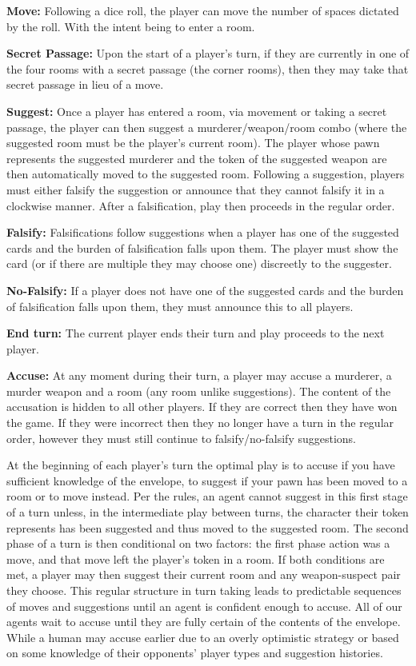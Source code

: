 \documentclass[msc, ai, twoside, notimes, logo, parskip, leftchapter, normalheadings]{infthesis}
\begin{document}
\begin{description}
\item \textbf{Move:} Following a dice roll, the player can move the number of spaces dictated by the roll. With the intent being to enter a room.
\item \textbf{Secret Passage:} Upon the start of a player's turn, if they are currently in one of the four rooms with a secret passage (the corner rooms), then they may take that secret passage in lieu of a move.
\item \textbf{Suggest:} Once a player has entered a room, via movement or taking a secret passage, the player can then suggest a murderer/weapon/room combo (where the suggested room must be the player's current room). The player whose pawn represents the suggested murderer and the token of the suggested weapon are then automatically moved to the suggested room. Following a suggestion, players must either falsify the suggestion or announce that they cannot falsify it in a clockwise manner. After a falsification, play then proceeds in the regular order.
\item \textbf{Falsify:} Falsifications follow suggestions when a player has one of the suggested cards and the burden of falsification falls upon them. The player must show the card (or if there are multiple they may choose one) discreetly to the suggester.
\item \textbf{No-Falsify:} If a player does not have one of the suggested cards and the burden of falsification falls upon them, they must announce this to all players.
\item \textbf{End turn:} The current player ends their turn and play proceeds to the next player.
\item \textbf{Accuse:} At any moment during their turn, a player may accuse a murderer, a murder weapon and a room (any room unlike suggestions). The content of the accusation is hidden to all other players. If they are correct then they have won the game. If they were incorrect then they no longer have a turn in the regular order, however they must still continue to falsify/no-falsify suggestions.
\end{description}

At the beginning of each player's turn the optimal play is to accuse if you have sufficient knowledge of the envelope, to suggest if your pawn has been moved to a room or to move instead. Per the rules, an agent cannot suggest in this first stage of a turn unless, in the intermediate play between turns, the character their token represents has been suggested and thus moved to the suggested room. The second phase of a turn is then conditional on two factors: the first phase action was a move, and that move left the player's token in a room. If both conditions are met, a player may then suggest their current room and any weapon-suspect pair they choose. This regular structure in turn taking leads to predictable sequences of moves and suggestions until an agent is confident enough to accuse. All of our agents wait to accuse until they are fully certain of the contents of the envelope. While a human may accuse earlier due to an overly optimistic strategy or based on some knowledge of their opponents' player types and suggestion histories. 
\end{document}
